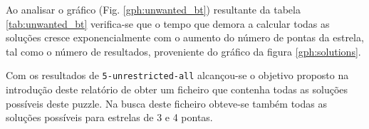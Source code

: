 Ao analisar o gráfico (Fig. \ref{gph:unwanted_bt}) resultante da tabela \ref{tab:unwanted_bt} verifica-se que o tempo que demora a calcular todas as soluções cresce exponencialmente com o aumento do número de pontas da estrela, tal como o número de resultados, proveniente do gráfico da figura \ref{gph:solutions}.

Com os resultados de \verb|5-unrestricted-all| alcançou-se o objetivo proposto na introdução deste relatório de obter um ficheiro que contenha todas as soluções possíveis deste puzzle. Na busca deste ficheiro obteve-se também todas as soluções possíveis para estrelas de 3 e 4 pontas.
